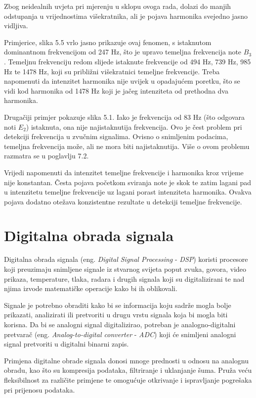 \documentclass[times, utf8, diplomski, numeric]{fer}
\begin{document}
\clearpage

Zbog neidealnih uvjeta pri mjerenju u sklopu ovoga rada, dolazi do manjih odstupanja u vrijednostima višekratnika, ali je pojava harmonika svejedno jasno vidljiva.

Primjerice, slika 5.5 vrlo jasno prikazuje ovaj fenomen, s istaknutom dominantnom frekvencijom od 247 Hz, što je upravo temeljna frekvencija note $B_3$. Temeljnu frekvenciju redom slijede istaknute frekvencije od 494 Hz, 739 Hz, 985 Hz te 1478 Hz, koji su približni višekratnici temeljne frekvencije. Treba napomenuti da intenzitet harmonika nije uvijek u opadajućem poretku, što se vidi kod harmonika od 1478 Hz koji je jačeg intenziteta od prethodna dva harmonika.

Drugačiji primjer pokazuje slika 5.1. Iako je frekvencija od 83 Hz (što odgovara noti $E_2$) istaknuta, ona nije najistaknutija frekvencija. Ovo je čest problem pri detekciji frekvencija u zvučnim signalima. Ovisno o snimljenim podacima, temeljna frekvencija može, ali ne mora biti najistaknutija.\cite{gustine_2021} Više o ovom problemu razmatra se u poglavlju 7.2.

Vrijedi napomenuti da intenzitet temeljne frekvencije i harmonika kroz vrijeme nije konstantan. Česta pojava početkom sviranja note je skok te zatim lagani pad u intenzitetu temeljne frekvencije uz lagani porast intenziteta harmonika. Ovakva pojava dodatno otežava konzistentne rezultate u detekciji temeljne frekvencije.

\chapter{Digitalna obrada signala}
Digitalna obrada signala (eng. \textit{Digital Signal Processing} - \textit{DSP}) koristi procesore koji preuzimaju snimljene signale iz stvarnog svijeta poput zvuka, govora, video prikaza, temperature, tlaka, radara i drugih signala koji su digitalizirani te nad njima izvode matematičke operacije kako bi ih oblikovali.

Signale je potrebno obraditi kako bi se informacija koju sadrže mogla bolje prikazati, analizirati ili pretvoriti u drugu vrstu signala koja bi mogla biti korisna. Da bi se analogni signal digitalizirao, potreban je analogno-digitalni pretvarač (eng. \textit{Analog-to-digital converter} - \textit{ADC}) koji će snimljeni analogni signal pretvoriti u digitalni binarni zapis.

Primjena digitalne obrade signala donosi mnoge prednosti u odnosu na analognu obradu, kao što su kompresija podataka, filtriranje i uklanjanje šuma. Pruža veću fleksibilnost za različite primjene te omogućuje otkrivanje i ispravljanje pogrešaka pri prijenosu podataka.\cite{broesch2008digital}
\clearpage
\end{document}

